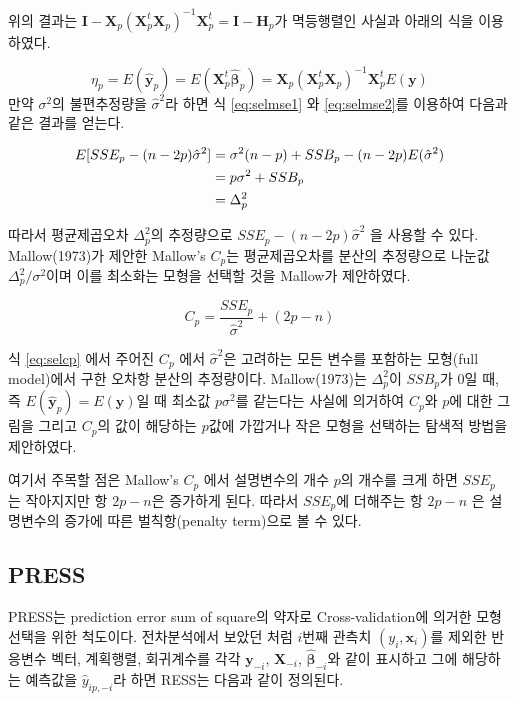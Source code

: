 \documentclass[
  10pt,
]{book}
\theoremstyle{definition}
\theoremstyle{definition}
\theoremstyle{definition}
\theoremstyle{definition}
\theoremstyle{remark}
\begin{document}
위의 결과는 \({\bm I} - {\bm X}_p ({\bm X}_p^t {\bm X}_p)^{-1}{\bm X}_p^t = {\bm I} -{\bm H}_p\)가 멱등행렬인 사실과 아래의 식을 이용하였다.

\[ \eta_p = E(\hat {\bm y}_p) = E({\bm X}_p^t \hat {\bm \beta}_p) =  {\bm X}_p ({\bm X}_p^t {\bm X}_p)^{-1}{\bm X}_p^t E( {\bm y}) \]
만약 \(\sigma^2\)의 불편추정량을 \(\hat \sigma^2\)라 하면 식 \eqref{eq:selmse1} 와 \eqref{eq:selmse2}를
이용하여 다음과 같은 결과를 얻는다.

\begin{align}
E[SSE_p -(n-2p)\hat \sigma^2] & = \sigma^2(n-p) + SSB_p -(n-2p) E(\hat \sigma^2) \\ \notag  
       & = p\sigma^2 +SSB_p  \\ \notag 
       & = \Delta_p^2 
\label{eq:selcp2}
\end{align}

따라서 평균제곱오차 \(\Delta_p^2\)의 추정량으로 \(SSE_p -(n-2p)\hat \sigma^2\) 을 사용할 수 있다. Mallow(1973)가 제안한 Mallow's \(C_p\)는 평균제곱오차를 분산의 추정량으로 나눈값 \(\Delta_p^2/\sigma^2\)이며 이를 최소화는 모형을 선택할 것을 Mallow가 제안하였다.

\begin{equation}
C_p = \frac{SSE_p}{\hat \sigma^2 } + (2p-n) 
\label{eq:selcp}
\end{equation}

식 \eqref{eq:selcp} 에서 주어진 \(C_p\) 에서 \(\hat \sigma^2\)은 고려하는 모든 변수를 포함하는 모형(full model)에서 구한 오차항 분산의 추정량이다. Mallow(1973)는 \(\Delta_p^2\)이
\(SSB_p\)가 0일 때, 즉 \(E(\hat {\bm y}_p)=E({\bm y})\)일 때 최소값 \(p \sigma^2\)를 같는다는 사실에 의거하여
\(C_p\)와 \(p\)에 대한 그림을 그리고 \(C_p\)의 값이 해당하는 \(p\)값에 가깝거나 작은 모형을 선택하는 탐색적 방법을 제안하였다.

여기서 주목할 점은 Mallow's \(C_p\) 에서 설명변수의 개수 \(p\)의 개수를 크게 하면 \(SSE_p\) 는 작아지지만
항 \(2p-n\)은 증가하게 된다. 따라서 \(SSE_p\)에 더해주는 항 \(2p-n\) 은 설명변수의 증가에 따른
벌칙항(penalty term)으로 볼 수 있다.

\hypertarget{press}{%
\subsection{PRESS}\label{press}}

PRESS는 prediction error sum of square의 약자로 Cross-validation에 의거한 모형선택을 위한 척도이다. 전차분석에서 보았던 처럼 \(i\)번째 관측치 \((y_i,{\bm x}_i)\)를 제외한 반응변수 벡터, 계획행렬, 회귀계수를 각각 \({\bm y}_{-i}\), \({\bm X}_{-i}\), \(\hat {\bm \beta}_{-i}\)와 같이 표시하고 그에 해당하는 예측값을 \(\hat y_{ip,-i}\)라 하면 RESS는 다음과 같이 정의된다.
\end{document}
